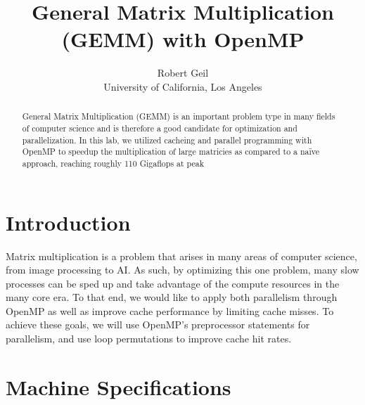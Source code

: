 \documentclass[letterpaper,twocolumn,10pt]{article}
\begin{document}

\date{}

\title{\Large \bf General Matrix Multiplication (GEMM) with OpenMP}

\author{
{\rm Robert Geil}\\
University of California, Los Angeles
} %

\maketitle

\begin{abstract}
General Matrix Multiplication (GEMM) is an important problem type in many fields
of computer science and is therefore a good candidate for optimization and
parallelization. In this lab, we utilized cacheing and parallel programming with
OpenMP to speedup the multiplication of large matricies as compared to a na\"{i}ve 
approach, reaching roughly 110 Gigaflops at peak
\end{abstract}


\section{Introduction}

Matrix multiplication is a problem that arises in many areas of computer science,
from image processing to AI. As such, by optimizing this one problem, many slow
processes can be sped up and take advantage of the compute resources in the
many core era. To that end, we would like to apply both parallelism through
OpenMP as well as improve cache performance by limiting cache misses. To achieve
these goals, we will use OpenMP's preprocessor statements for parallelism, and
use loop permutations to improve cache hit rates.

\section{Machine Specifications}
\end{document}
